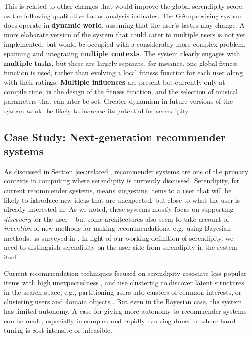 This is related to other changes that would improve the global serendipity score, as the following qualitative factor analysis indicates.
%
The {\sf GAmprovising} system does operate in \textbf{dynamic world},
assuming that the user's tastes may change.  A more elaborate version
of the system that could cater to multiple users is not yet
implemented, but would be occupied with a considerably more complex
problem, spanning and integrating \textbf{multiple contexts}.  The
system clearly engages with \textbf{multiple tasks}, but these are
largely separate, for instance, one global fitness function is used,
rather than evolving a local fitness function for each user along with
their ratings.  \textbf{Multiple influences} are present but currently
only at compile time, in the design of the fitness function, and the
selection of musical parameters that can later be set.  Greater
dynamism in future versions of the system would be likely to increase
its potential for serendipity.

\subsection{Case Study: Next-generation recommender systems} \label{sec:nextgenrec}
As discussed in Section \ref{sec:related}, recommender systems are one
of the primary contexts in computing where serendipity is currently discussed.  Serendipity, for current recommender systems, means suggesting items to a user that will be likely to introduce new ideas that are unexpected, but close to what the user is already interested in.  As we noted, these systems mostly focus on supporting \emph{discovery} for the user -- but some architectures also seem to take account of \emph{invention} of new methods for making recommendations, e.g.~using Bayesian methods, as surveyed in .  In light of our working definition of serendipity, we need to distinguish serendipity on the user side from serendipity in the system itself.

Current recommendation techniques focused on serendipity associate less popular items with high unexpectedness \cite{Herlocker2004,Lu2012}, and use clustering to discover latent structures in the search space, e.g., partitioning users into clusters of common interests, or clustering users and domain objects \cite{Kamahara2005,Onuma2009,Zhang2011}.  But even in the Bayesian case, the system has limited autonomy.  A case for giving more autonomy to recommender systems can be made, especially in complex and rapidly evolving domains where hand-tuning is cost-intensive or infeasible.

